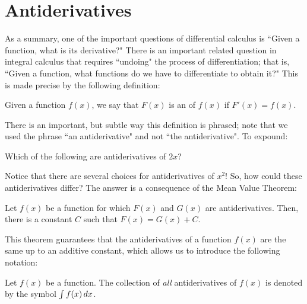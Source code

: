 \documentclass[nooutcomes]{ximera}
\begin{document}
\section{Antiderivatives}


As a summary, one of the important questions of differential calculus is ``Given a function, what is its derivative?"  There is an important related question in integral calculus that requires ``undoing" the process of differentiation; that is, ``Given a function, what functions do we have to differentiate to obtain it?"   This is made precise by the following definition:

\begin{definition}  
Given a function $f(x)$, we say that $F(x)$ is an  of $f(x)$ if $F'(x) = f(x)$.
\end{definition}

 There is an important, but subtle way this definition is phrased; note that we used the phrase ``an antiderivative" and not ``the antiderivative".  To expound:
 
 \begin{question}
  Which of the following are antiderivatives of $2x$?
  \begin{selectAll}
  \end{selectAll}
\end{question}

Notice that there are several choices for antiderivatives of $x^2$!  So, how could these antiderivatives differ?  The answer is a consequence of the Mean Value Theorem:

\begin{theorem}
Let $f(x)$ be a function for which $F(x)$ and $G(x)$ are antiderivatives.  Then, there is a constant $C$ such that $F(x) = G(x) +C$. 
\end{theorem}

This theorem guarantees that the antiderivatives of a function $f(x)$ are the same up to an additive constant, which allows us to introduce the following notation:


\begin{definition}
Let $f(x)$ be a function.  The collection of \emph{all} antiderivatives of $f(x)$ is denoted by the symbol $\int f(x) \mathop{}\!d x$. 
\end{definition}
\end{document}
